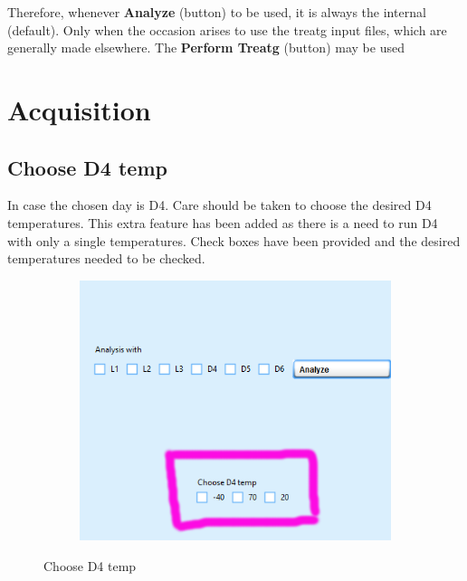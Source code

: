 \documentclass[12pt]{article}
\begin{document}
    Therefore, whenever \textbf{Analyze} (button) to be used, it is always the internal (default). Only when the occasion arises to use the treatg input files, which are generally made elsewhere. The \textbf{Perform Treatg} (button) may be used 
 
    
 
 
 
    \section{Acquisition}
    
    \subsection{Choose D4 temp}
    In case the chosen day is D4. Care should be taken to choose the desired D4 temperatures. This extra feature has been added as there is a need to run D4 with only a single temperatures. Check boxes have been provided and the desired temperatures needed  to be checked. 
    
    \begin{figure}[H]
 
    \begin{subfigure}{1.0\textwidth}
    \includegraphics[scale=0.5]{images/choose_D4_temp.png} 
    \label{fig:DJp1}
    \end{subfigure}
 
 \caption{Choose D4 temp}
\label{fig6}
\end{figure}
    
\end{document}
